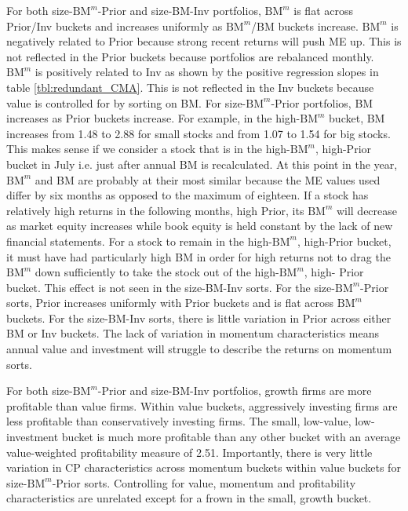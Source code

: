 For both size-$\text{BM}^m$-Prior and size-BM-Inv portfolios, $\text{BM}^m$ is
flat across Prior/Inv buckets and increases uniformly as $\text{BM}^m$/BM
buckets increase. $\text{BM}^m$ is negatively related to Prior because strong
recent returns will push ME up. This is not reflected in the Prior buckets
because portfolios are rebalanced monthly. $\text{BM}^m$ is positively related
to Inv as shown by the positive regression slopes in table
\ref{tbl:redundant_CMA}. This is not reflected in the Inv buckets because value
is controlled for by sorting on BM. For size-$\text{BM}^m$-Prior portfolios, BM
increases as Prior buckets increase. For example, in the high-$\text{BM}^m$
bucket, BM increases from 1.48 to 2.88 for small stocks and from 1.07 to 1.54
for big stocks. This makes sense if we consider a stock that is in the
high-$\text{BM}^m$, high-Prior bucket in July i.e. just after annual BM is
recalculated. At this point in the year, $\text{BM}^m$ and BM are probably at
their most similar because the ME values
used differ by six months as opposed to the
maximum of eighteen. If a stock has relatively high returns in the following
months, high Prior, its $\text{BM}^m$ will decrease as market equity increases
while book equity is held constant by the lack of new financial statements. For
a stock to remain in the high-$\text{BM}^m$, high-Prior bucket, it must have
had particularly high BM in order for high returns not to drag the
$\text{BM}^m$ down sufficiently to take the stock out of the
high-$\text{BM}^m$, high- Prior bucket. This effect is not seen in the
size-BM-Inv sorts.
For the size-$\text{BM}^m$-Prior sorts, Prior increases uniformly
with Prior buckets and is flat across $\text{BM}^m$ buckets.
For the size-BM-Inv sorts, there is little variation in Prior across either
BM or Inv buckets.
The lack of variation in momentum characteristics means annual value and
investment will struggle to describe the returns on momentum
sorts.

For both size-$\text{BM}^m$-Prior and size-BM-Inv portfolios,
growth firms are more profitable than value firms.
Within value buckets, aggressively investing firms are less profitable than
conservatively investing firms.
The small, low-value, low-investment bucket is much more profitable than any
other bucket with an average value-weighted profitability measure of 2.51.
Importantly, there is very little variation in CP characteristics across
momentum buckets within value buckets for size-$\text{BM}^m$-Prior sorts.
Controlling for value, momentum and profitability characteristics are unrelated
except for a frown in the small, growth bucket.

